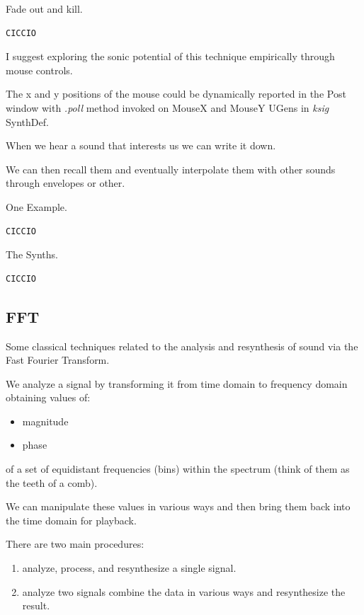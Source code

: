 Fade out and kill.

\begin{lstlisting}[frame=single] 
CICCIO
\end{lstlisting}

I suggest exploring the sonic potential of this technique empirically through mouse controls.

The x and y positions of the mouse could be dynamically reported in the Post window with \textit{.poll} method invoked on MouseX and MouseY UGens in \textit{ksig} SynthDef.

When we hear a sound that interests us we can write it down.

We can then recall them and eventually interpolate them with other sounds through envelopes or other.

One Example.

\begin{lstlisting}[frame=single] 
CICCIO
\end{lstlisting}

The Synths.

\begin{lstlisting}[frame=single] 
CICCIO
\end{lstlisting}

\subsection{FFT}\label{fft}

Some classical techniques related to the analysis and resynthesis of sound via the Fast Fourier Transform.

We analyze a signal by transforming it from time domain to frequency domain obtaining values of:

\begin{itemize}
\tightlist 
\item magnitude
\item phase
\end{itemize}

of a set of equidistant frequencies (bins) within the spectrum (think of them as the teeth of a comb).

We can manipulate these values in various ways and then bring them back into the time domain for playback.

There are two main procedures:

\begin{enumerate}
\tightlist 
\item analyze, process, and resynthesize a single signal. 
\item analyze two signals combine the data in various ways and resynthesize the result.
\end{enumerate}

